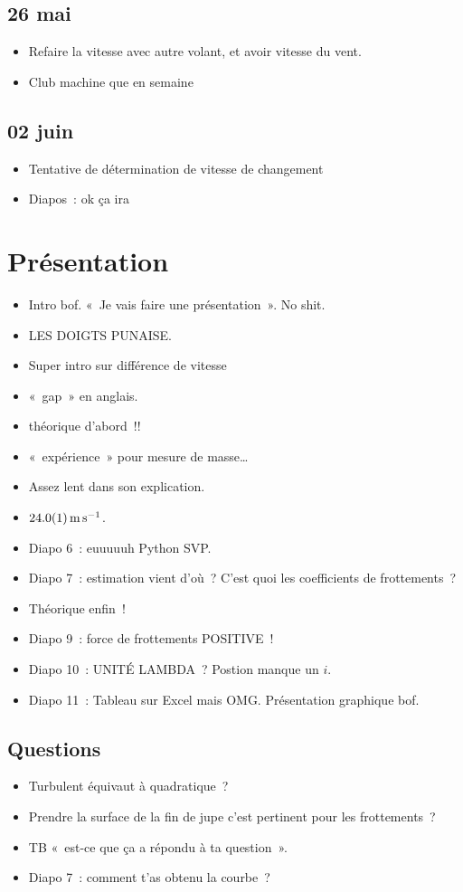 \documentclass[a4paper, 11pt, final, garamond]{book}
\begin{document}
\subsection{26 mai}
\begin{itemize}
  \item Refaire la vitesse avec autre volant, et avoir vitesse du vent.
  \item Club machine que en semaine
\end{itemize}

\subsection{02 juin}
\begin{itemize}
  \item Tentative de détermination de vitesse de changement
  \item Diapos~: ok ça ira
\end{itemize}

\section{Présentation}
\begin{itemize}
  \item Intro bof. «~Je vais faire une présentation~». No shit.
  \item LES DOIGTS PUNAISE.
  \item Super intro sur différence de vitesse
  \item «~gap~» en anglais.
  \item théorique d'abord~!!
  \item «~expérience~» pour mesure de masse…
  \item Assez lent dans son explication.
  \item $\SI{24\pm 0.1}{m.s^{-1}}$.
  \item Diapo 6~: euuuuuh Python SVP.
  \item Diapo 7~: estimation vient d'où~? C'est quoi les coefficients de
    frottements~?
  \item Théorique enfin~!
  \item Diapo 9~: force de frottements POSITIVE~!
  \item Diapo 10~: UNITÉ LAMBDA~? Postion manque un $i$.
  \item Diapo 11~: Tableau sur Excel mais OMG. Présentation graphique bof.
\end{itemize}

\subsection{Questions}
\label{ssec:q}
\begin{itemize}
  \item Turbulent équivaut à quadratique~?
  \item Prendre la surface de la fin de jupe c'est pertinent pour les
    frottements~?
  \item TB «~est-ce que ça a répondu à ta question~».
  \item Diapo 7~: comment t'as obtenu la courbe~?
\end{itemize}
\end{document}

